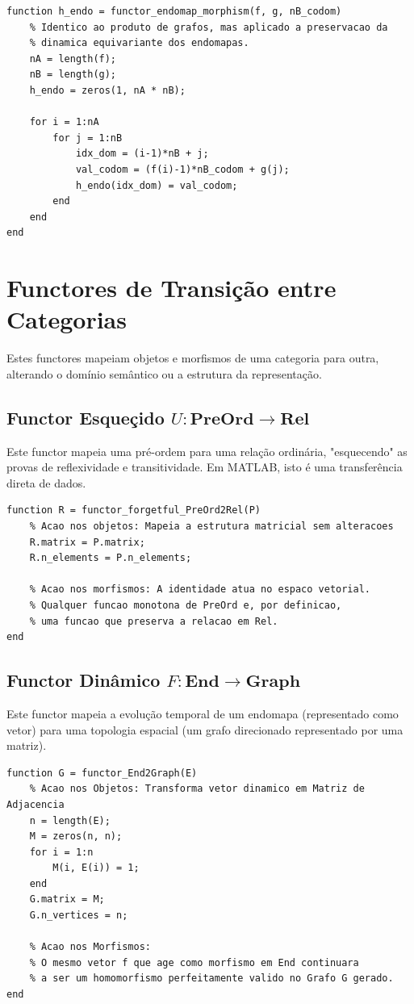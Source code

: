 \documentclass[11pt,a4paper]{article}
\begin{document}
\begin{lstlisting}[caption={Ação do Bifunctor de Produto nos Morfismos de Endomapas}]
function h_endo = functor_endomap_morphism(f, g, nB_codom)
    % Identico ao produto de grafos, mas aplicado a preservacao da 
    % dinamica equivariante dos endomapas.
    nA = length(f);
    nB = length(g);
    h_endo = zeros(1, nA * nB);
    
    for i = 1:nA
        for j = 1:nB
            idx_dom = (i-1)*nB + j;
            val_codom = (f(i)-1)*nB_codom + g(j);
            h_endo(idx_dom) = val_codom;
        end
    end
end
\end{lstlisting}

\section{Functores de Transição entre Categorias}
Estes functores mapeiam objetos e morfismos de uma categoria para outra, alterando o domínio semântico ou a estrutura da representação.

\subsection{Functor Esqueçido $U: \mathbf{PreOrd} \to \mathbf{Rel}$}
Este functor mapeia uma pré-ordem para uma relação ordinária, "esquecendo" as provas de reflexividade e transitividade. Em MATLAB, isto é uma transferência direta de dados.

\begin{lstlisting}[caption={Functor U: PreOrd -> Rel}]
function R = functor_forgetful_PreOrd2Rel(P)
    % Acao nos objetos: Mapeia a estrutura matricial sem alteracoes
    R.matrix = P.matrix;
    R.n_elements = P.n_elements;
    
    % Acao nos morfismos: A identidade atua no espaco vetorial.
    % Qualquer funcao monotona de PreOrd e, por definicao,
    % uma funcao que preserva a relacao em Rel.
end
\end{lstlisting}

\subsection{Functor Dinâmico $F: \mathbf{End} \to \mathbf{Graph}$}
Este functor mapeia a evolução temporal de um endomapa (representado como vetor) para uma topologia espacial (um grafo direcionado representado por uma matriz).

\begin{lstlisting}[caption={Functor F: End -> Graph}]
function G = functor_End2Graph(E)
    % Acao nos Objetos: Transforma vetor dinamico em Matriz de Adjacencia
    n = length(E);
    M = zeros(n, n);
    for i = 1:n
        M(i, E(i)) = 1;
    end
    G.matrix = M;
    G.n_vertices = n;
    
    % Acao nos Morfismos:
    % O mesmo vetor f que age como morfismo em End continuara 
    % a ser um homomorfismo perfeitamente valido no Grafo G gerado.
end
\end{lstlisting}
\end{document}
